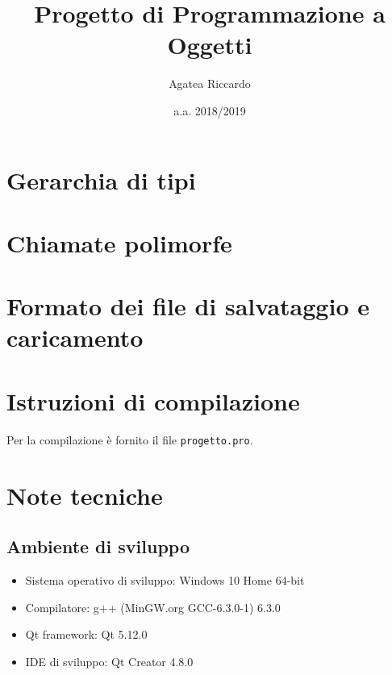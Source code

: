 \documentclass{article}
\title{Progetto di Programmazione a Oggetti}
\author{Agatea Riccardo}
\date{a.a. 2018/2019}
\begin{document}
\maketitle
\newpage
{}
\section{Gerarchia di tipi} %
\label{sec:gerarchia_di_tipi}

\section{Chiamate polimorfe} %
\label{sec:chiamate_polimorfe}

\section{Formato dei file di salvataggio e caricamento} %
\label{sec:formato_dei_file_di_salvataggio_e_caricamento}

\section{Istruzioni di compilazione} %
\label{sec:istruzioni_di_compilazione}
Per la compilazione è fornito il file \verb|progetto.pro|.
\section{Note tecniche} %
\label{sec:note_tecniche}
\subsection{Ambiente di sviluppo} %
\label{sub:ambiente_di_sviluppo}
\begin{itemize}
	\item Sistema operativo di sviluppo: Windows 10 Home 64-bit
	\item Compilatore: g++ (MinGW.org GCC-6.3.0-1) 6.3.0
	\item Qt framework: Qt 5.12.0
	\item IDE di sviluppo: Qt Creator 4.8.0
\end{itemize}
\end{document}
